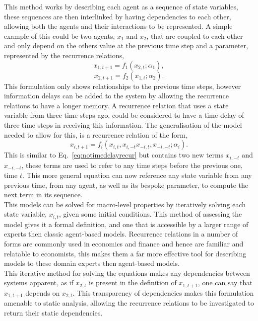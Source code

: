 \documentclass{article}
\begin{document}
This method works by describing each agent as a sequence of state variables, these sequences are then interlinked by having dependencies to each other, allowing both the agents and their interactions to be represented. A simple example of this could be two agents, $x_{1}$ and $x_{2}$, that are coupled to each other and only depend on the others value at the previous time step and a parameter, represented by the recurrence relations,     
\begin{equation}
x_{1, t+1} = f_{1}(x_{2,t}; \alpha_{1}),
\end{equation}
\begin{equation}
x_{2, t+1} = f_{2}(x_{1,t}; \alpha_{2}).
\end{equation}
This formulation only shows relationships to the previous time steps, however information delays can be added to the system by allowing the recurrence relations to have a longer memory. A recurrence relation that uses a state variable from three time steps ago, could be considered to have a time delay of three time steps in receiving this information. The generalisation of the model needed to allow for this, is a recurrence relation of the form, 
\begin{equation}
x_{i, t+1} = f_{i}(x_{i, t}, x_{i, -t} x_{-i,t}, x_{-i, -t}; \alpha_{i}).
\end{equation}
This is similar to Eq.~\ref{eq:notimedelayrecur} but contains two new terms $x_{i, -t}$ and $x_{-i, -t}$, these terms are used to refer to any time steps before the previous one, time $t$. This more general equation can now reference any state variable from any previous time, from any agent, as well as its bespoke parameter, to compute the next term in its sequence.\\  
This models can be solved for macro-level properties by iteratively solving each state variable, $x_{i, t}$, given some initial conditions. This method of assessing the model gives it a formal definition, and one that is accessible by a larger range of experts then classic agent-based models. Recurrence relations in a number of forms are commonly used in economics and finance and hence are familiar and relatable to economists, this makes them a far more effective tool for describing models to these domain experts then agent-based models.\\
This iterative method for solving the equations makes any dependencies between systems apparent, as if $x_{2, t}$ is present in the definition of $x_{1, t+1}$, one can say that $x_{1,t+1}$ depends on $x_{2,t}$. This transparency of dependencies makes this formulation amenable to static analysis, allowing the recurrence relations to be investigated to return their static dependencies.\\
\end{document}
